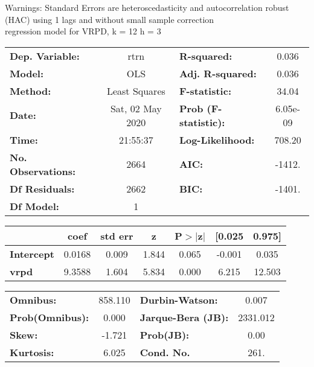 Warnings: \newline
 [1] Standard Errors are heteroscedasticity and autocorrelation robust (HAC) using 1 lags and without small sample correction\\ 

regression model for VRPD, k = 12 h = 3\begin{center}
\begin{tabular}{lclc}
\toprule
\textbf{Dep. Variable:}    &       rtrn       & \textbf{  R-squared:         } &     0.036   \\
\textbf{Model:}            &       OLS        & \textbf{  Adj. R-squared:    } &     0.036   \\
\textbf{Method:}           &  Least Squares   & \textbf{  F-statistic:       } &     34.04   \\
\textbf{Date:}             & Sat, 02 May 2020 & \textbf{  Prob (F-statistic):} &  6.05e-09   \\
\textbf{Time:}             &     21:55:37     & \textbf{  Log-Likelihood:    } &    708.20   \\
\textbf{No. Observations:} &        2664      & \textbf{  AIC:               } &    -1412.   \\
\textbf{Df Residuals:}     &        2662      & \textbf{  BIC:               } &    -1401.   \\
\textbf{Df Model:}         &           1      & \textbf{                     } &             \\
\bottomrule
\end{tabular}
\begin{tabular}{lcccccc}
                   & \textbf{coef} & \textbf{std err} & \textbf{z} & \textbf{P$> |$z$|$} & \textbf{[0.025} & \textbf{0.975]}  \\
\midrule
\textbf{Intercept} &       0.0168  &        0.009     &     1.844  &         0.065        &       -0.001    &        0.035     \\
\textbf{vrpd}      &       9.3588  &        1.604     &     5.834  &         0.000        &        6.215    &       12.503     \\
\bottomrule
\end{tabular}
\begin{tabular}{lclc}
\textbf{Omnibus:}       & 858.110 & \textbf{  Durbin-Watson:     } &    0.007  \\
\textbf{Prob(Omnibus):} &   0.000 & \textbf{  Jarque-Bera (JB):  } & 2331.012  \\
\textbf{Skew:}          &  -1.721 & \textbf{  Prob(JB):          } &     0.00  \\
\textbf{Kurtosis:}      &   6.025 & \textbf{  Cond. No.          } &     261.  \\
\bottomrule
\end{tabular}
\end{center}

